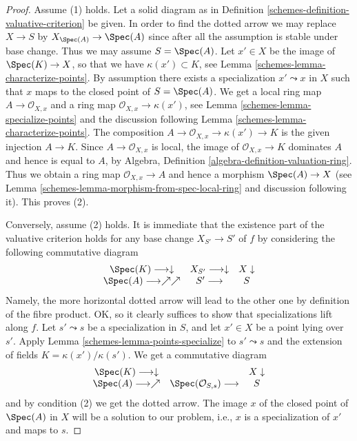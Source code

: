 \begin{proof}

Assume (1) holds. Let a solid diagram as in
Definition \ref{schemes-definition-valuative-criterion} be given.
In order to find the dotted arrow we may replace $X \to S$
by $X_{\Spec(A)} \to \Spec(A)$ since after all
the assumption is stable under base change.
Thus we may assume $S = \Spec(A)$.
Let $x' \in X$ be the image of $\Spec(K) \to X$, so
that we have $\kappa(x') \subset K$, see
Lemma \ref{schemes-lemma-characterize-points}.
By assumption there exists a specialization $x' \leadsto x$
in $X$ such that $x$ maps to the closed point of $S = \Spec(A)$.
We get a local ring map $A \to \mathcal{O}_{X, x}$ and a ring
map $\mathcal{O}_{X, x} \to \kappa(x')$, see
Lemma \ref{schemes-lemma-specialize-points} and the discussion following
Lemma \ref{schemes-lemma-characterize-points}. The composition
$A \to \mathcal{O}_{X, x} \to \kappa(x') \to K$ is the
given injection $A \to K$. Since $A \to \mathcal{O}_{X, x}$
is local, the image of $\mathcal{O}_{X, x} \to K$
dominates $A$ and hence is equal to $A$, by
Algebra, Definition \ref{algebra-definition-valuation-ring}.
Thus we obtain a ring map $\mathcal{O}_{X, x} \to A$ and
hence a morphism $\Spec(A) \to X$
(see Lemma \ref{schemes-lemma-morphism-from-spec-local-ring} and
discussion following it). This proves (2).

\medskip\noindent
Conversely, assume (2) holds. It is immediate that
the existence part of the valuative criterion holds for
any base change $X_{S'} \to S'$ of $f$ by considering
the following commutative diagram
$$
\begin{array}{ccc}\Spec(K) \longrightarrow\downarrow & X_{S'} \longrightarrow\downarrow & X \downarrow \\ \Spec(A) \longrightarrow\nearrow\nearrow & S' \longrightarrow & S\end{array}
$$
Namely, the more horizontal dotted arrow will lead to the
other one by definition of the fibre product. OK, so it clearly
suffices to show that specializations lift along $f$.
Let $s' \leadsto s$ be a specialization in $S$, and let
$x' \in X$ be a point lying over $s'$. Apply
Lemma \ref{schemes-lemma-points-specialize}
to $s' \leadsto s$ and the extension of fields
$K = \kappa(x')/\kappa(s')$.
We get a commutative diagram
$$
\begin{array}{ccc}\Spec(K) \longrightarrow\downarrow &  & X \downarrow \\ \Spec(A) \longrightarrow\nearrow & \Spec(\mathcal{O}_{S, s}) \longrightarrow & S\end{array}
$$
and by condition (2) we get the dotted arrow.
The image $x$ of the closed point of $\Spec(A)$
in $X$ will be a solution to our problem, i.e.,
$x$ is a specialization of $x'$ and maps to $s$.
\end{proof}

